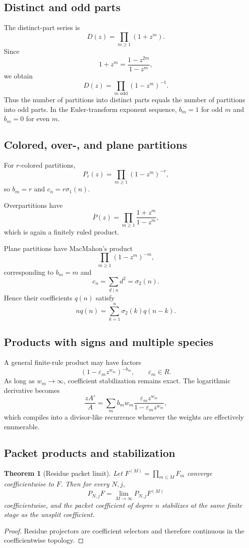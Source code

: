 \documentclass[11pt]{article}
\newtheorem{theorem}{Theorem}[section]\newtheorem{proposition}[theorem]{Proposition}\newtheorem{lemma}[theorem]{Lemma}\newtheorem{corollary}[theorem]{Corollary}
\theoremstyle{definition}\newtheorem{definition}[theorem]{Definition}\newtheorem{example}[theorem]{Example}\newtheorem{construction}[theorem]{Construction}\newtheorem{algorithm}[theorem]{Algorithm}\newtheorem{conjecture}[theorem]{Conjecture}\newtheorem{problem}[theorem]{Problem}
\theoremstyle{remark}\newtheorem{remark}[theorem]{Remark}\newtheorem{boundary}[theorem]{Boundary}\newtheorem{certificate}[theorem]{Computational Certificate}\newtheorem{classical}[theorem]{Classical Input}\newtheorem{principle}[theorem]{Structural Principle}
\begin{document}
\subsection{Distinct and odd parts}
The distinct-part series is
\[
 D(z)=\prod_{m\geq1}(1+z^m).
\]
Since
\[
 1+z^m=\frac{1-z^{2m}}{1-z^m},
\]
we obtain
\[
 D(z)=\prod_{m\text{ odd}}(1-z^m)^{-1}.
\]
Thus the number of partitions into distinct parts equals the number of partitions into odd parts.  In the Euler-transform exponent sequence, $b_m=1$ for odd $m$ and $b_m=0$ for even $m$.

\subsection{Colored, over-, and plane partitions}
For $r$-colored partitions,
\[
 P_r(z)=\prod_{m\geq1}(1-z^m)^{-r},
\]
so $b_m=r$ and $c_n=r\sigma_1(n)$.

Overpartitions have
\[
 \overline P(z)=\prod_{m\geq1}\frac{1+z^m}{1-z^m},
\]
which is again a finitely ruled product.

Plane partitions have MacMahon's product
\[
 \prod_{m\geq1}(1-z^m)^{-m},
\]
corresponding to $b_m=m$ and
\[
 c_n=\sum_{d\mid n}d^2=\sigma_2(n).
\]
Hence their coefficients $q(n)$ satisfy
\[
 n q(n)=\sum_{k=1}^{n}\sigma_2(k)q(n-k).
\]

\subsection{Products with signs and multiple species}
A general finite-rule product may have factors
\[
 (1-\varepsilon_m z^{w_m})^{-b_m},
 \qquad \varepsilon_m\in R.
\]
As long as $w_m\to\infty$, coefficient stabilization remains exact.  The logarithmic derivative becomes
\[
 \frac{zA'}A
 =\sum_m b_m w_m\frac{\varepsilon_m z^{w_m}}{1-\varepsilon_m z^{w_m}},
\]
which compiles into a divisor-like recurrence whenever the weights are effectively enumerable.

\subsection{Packet products and stabilization}
\begin{theorem}[Residue packet limit]
Let $F^{(M)}=\prod_{m\leq M}F_m$ converge coefficientwise to $F$.  Then for every $N,j$,
\[
 \boxed{P_{N,j}F=\lim_{M\to\infty}P_{N,j}F^{(M)}}
\]
coefficientwise, and the packet coefficient of degree $n$ stabilizes at the same finite stage as the unsplit coefficient.
\end{theorem}
\begin{proof}
Residue projectors are coefficient selectors and therefore continuous in the coefficientwise topology.
\end{proof}
\end{document}
